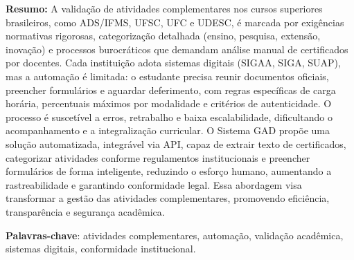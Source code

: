 \begin{resumo}

\textbf{Resumo:} A validação de atividades complementares nos cursos superiores brasileiros, como ADS/IFMS, UFSC, UFC e UDESC, é marcada por exigências normativas rigorosas, categorização detalhada (ensino, pesquisa, extensão, inovação) e processos burocráticos que demandam análise manual de certificados por docentes. Cada instituição adota sistemas digitais (SIGAA, SIGA, SUAP), mas a automação é limitada: o estudante precisa reunir documentos oficiais, preencher formulários e aguardar deferimento, com regras específicas de carga horária, percentuais máximos por modalidade e critérios de autenticidade. O processo é suscetível a erros, retrabalho e baixa escalabilidade, dificultando o acompanhamento e a integralização curricular. O Sistema GAD propõe uma solução automatizada, integrável via API, capaz de extrair texto de certificados, categorizar atividades conforme regulamentos institucionais e preencher formulários de forma inteligente, reduzindo o esforço humano, aumentando a rastreabilidade e garantindo conformidade legal. Essa abordagem visa transformar a gestão das atividades complementares, promovendo eficiência, transparência e segurança acadêmica.

\vspace{\onelineskip}

\textbf{Palavras-chave}: atividades complementares, automação, validação acadêmica, sistemas digitais, conformidade institucional.

\end{resumo}